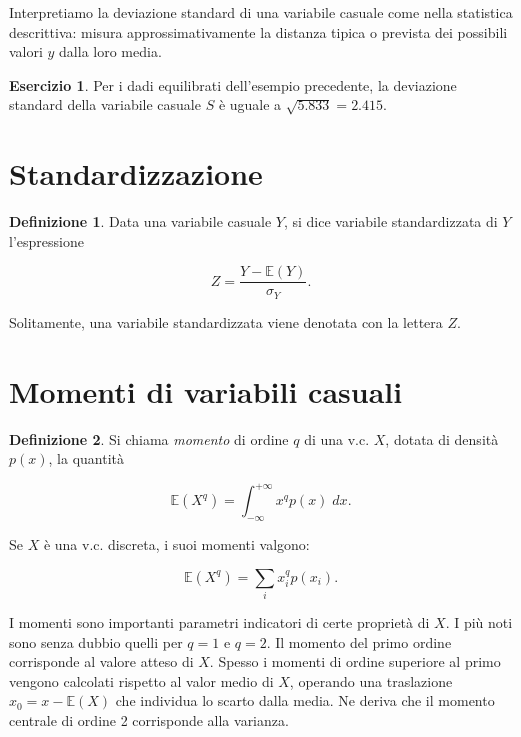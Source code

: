 \documentclass[
  11pt,
]{krantz}
\newcommand{\E}{\mathbb{E}} %
\theoremstyle{definition}
\newtheorem{definition}{Definizione}[chapter]
\theoremstyle{definition}
\theoremstyle{definition}
\newtheorem{exercise}{Esercizio}[chapter]
\theoremstyle{definition}
\theoremstyle{remark}
\begin{document}
Interpretiamo la deviazione standard di una variabile casuale come nella statistica descrittiva: misura approssimativamente la distanza tipica o prevista dei possibili valori \(y\) dalla loro media.

\begin{exercise}
Per i dadi equilibrati dell'esempio precedente, la deviazione standard della variabile casuale \(S\) è uguale a \(\sqrt{5.833} = 2.415\).
\end{exercise}

\hypertarget{standardizzazione}{%
\section{Standardizzazione}\label{standardizzazione}}

\begin{definition}
Data una variabile casuale \(Y\), si dice variabile standardizzata di \(Y\) l'espressione

\begin{equation}
Z = \frac{Y - \E(Y)}{\sigma_Y}.
\label{eq:standardization}
\end{equation}
\end{definition}

Solitamente, una variabile standardizzata viene denotata con la lettera \(Z\).

\hypertarget{momenti-di-variabili-casuali}{%
\section{Momenti di variabili casuali}\label{momenti-di-variabili-casuali}}

\begin{definition}
Si chiama \emph{momento} di ordine \(q\) di una v.c. \(X\), dotata di densità \(p(x)\), la quantità

\begin{equation}
\E(X^q) = \int_{-\infty}^{+\infty} x^q p(x) \; dx.
\end{equation}

Se \(X\) è una v.c. discreta, i suoi momenti valgono:

\begin{equation}
\E(X^q) = \sum_i x_i^q p(x_i).
\end{equation}
\end{definition}

I momenti sono importanti parametri indicatori di certe proprietà di \(X\). I più noti sono senza dubbio quelli per \(q = 1\) e \(q = 2\). Il momento del primo ordine corrisponde al valore atteso di \(X\). Spesso i momenti di ordine superiore al primo vengono calcolati rispetto al valor medio di \(X\), operando una traslazione \(x_0 = x − \E(X)\) che individua lo scarto dalla media. Ne deriva che il momento centrale di ordine 2 corrisponde alla varianza.

  

\printindex
\end{document}
